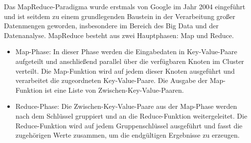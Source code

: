 \documentclass[../vs-script-first-v01.tex]{subfiles}
\begin{document}
Das MapReduce-Paradigma wurde erstmals von Google im Jahr 2004 eingeführt und ist seitdem zu einem grundlegenden Baustein in der Verarbeitung großer Datenmengen geworden, insbesondere im Bereich des Big Data und der Datenanalyse. MapReduce besteht aus zwei Hauptphasen: Map und Reduce.
\begin{itemize}  
\item Map-Phase: In dieser Phase werden die Eingabedaten in Key-Value-Paare aufgeteilt und anschließend parallel über die verfügbaren Knoten im Cluster verteilt. Die Map-Funktion wird auf jedem dieser Knoten ausgeführt und verarbeitet die zugeordneten Key-Value-Paare. Die Ausgabe der Map-Funktion ist eine Liste von Zwischen-Key-Value-Paaren.
\item Reduce-Phase: Die Zwischen-Key-Value-Paare aus der Map-Phase werden nach dem Schlüssel gruppiert und an die Reduce-Funktion weitergeleitet. Die Reduce-Funktion wird auf jedem Gruppenschlüssel ausgeführt und fasst die zugehörigen Werte zusammen, um die endgültigen Ergebnisse zu erzeugen.
\end{itemize}  
\end{document}
